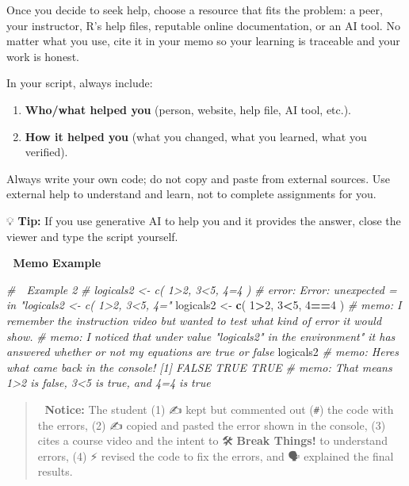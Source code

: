\documentclass[
  12pt,
]{scrreprt}
\newenvironment{Shaded}{\begin{snugshade}}{\end{snugshade}}
\newcommand{\CommentTok}[1]{\textcolor[rgb]{0.56,0.35,0.01}{\textit{#1}}}
\newcommand{\DecValTok}[1]{\textcolor[rgb]{0.00,0.00,0.81}{#1}}
\newcommand{\FunctionTok}[1]{\textcolor[rgb]{0.13,0.29,0.53}{\textbf{#1}}}
\newcommand{\NormalTok}[1]{#1}
\newcommand{\OtherTok}[1]{\textcolor[rgb]{0.56,0.35,0.01}{#1}}
\newcommand{\SpecialCharTok}[1]{\textcolor[rgb]{0.81,0.36,0.00}{\textbf{#1}}}
\begin{document}
Once you decide to seek help, choose a resource that fits the problem: a
peer, your instructor, R's help files, reputable online documentation,
or an AI tool. No matter what you use, cite it in your memo so your
learning is traceable and your work is honest.

In your script, always include:

\begin{enumerate}
\def\labelenumi{\arabic{enumi}.}
\item
  \textbf{Who/what helped you} (person, website, help file, AI tool,
  etc.).
\item
  \textbf{How it helped you} (what you changed, what you learned, what
  you verified).
\end{enumerate}

Always write your own code; do not copy and paste from external sources.
Use external help to understand and learn, not to complete assignments
for you.

💡 \textbf{Tip:} If you use generative AI to help you and it provides
the answer, close the viewer and type the script yourself.

🧩 \textbf{Memo Example}

\begin{Shaded}
\begin{Highlighting}[]
\CommentTok{\# 🧩 Example 2}
\CommentTok{\# logicals2 \textless{}{-} c( 1\textgreater{}2, 3\textless{}5, 4=4 )}
\CommentTok{\# error: Error: unexpected \textquotesingle{}=\textquotesingle{} in "logicals2 \textless{}{-} c( 1\textgreater{}2, 3\textless{}5, 4="}
\NormalTok{logicals2 }\OtherTok{\textless{}{-}} \FunctionTok{c}\NormalTok{( }\DecValTok{1}\SpecialCharTok{\textgreater{}}\DecValTok{2}\NormalTok{, }\DecValTok{3}\SpecialCharTok{\textless{}}\DecValTok{5}\NormalTok{, }\DecValTok{4}\SpecialCharTok{==}\DecValTok{4}\NormalTok{ )}
\CommentTok{\# memo: I remember the instruction video but wanted to test what kind of error it would show.}
\CommentTok{\# memo: I noticed that under value "logicals2" in the environment" it has answered whether or not my equations are true or false}
\NormalTok{logicals2}
\CommentTok{\# memo: Here\textquotesingle{}s what came back in the console! [1] FALSE  TRUE  TRUE}
\CommentTok{\# memo: That means 1\textgreater{}2 is false, 3\textless{}5 is true, and 4=4 is true}
\end{Highlighting}
\end{Shaded}

\begin{quote}
🧐 \textbf{Notice:} The student (1) ✍️ kept but commented out
(\texttt{\#}) the code with the errors, (2) ✍️ copied and pasted the
error shown in the console, (3) 👀 cites a course video and the intent
to 🛠 \textbf{Break Things!} to understand errors, (4) ⚡ revised the
code to fix the errors, and 🗣 explained the final results.
\end{quote}
\end{document}
